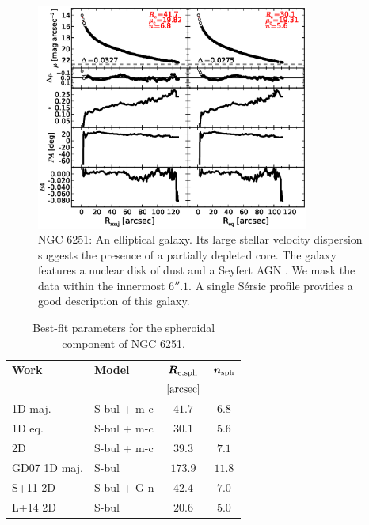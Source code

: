 \documentclass[preprint2]{emulateapj}
\newcommand{\fitfigurewidth}{0.8\textwidth}
\begin{document}
  \begin{figure}[h]
  \begin{center}
  \includegraphics[width=\fitfigurewidth]{images/n6251_1Dfit.eps}
  \caption{NGC 6251: 
  An elliptical galaxy. 
  Its large stellar velocity dispersion suggests the presence of a partially depleted core.
  The galaxy features a nuclear disk of dust \citep{ferrareseford1999n6251} and a Seyfert AGN \citep{panessabassani2002}.
  We mask the data within the innermost $6''.1$. 
  A single S\'ersic profile provides a good description of this galaxy.
  }
  \end{center}
  \end{figure}

  \begin{table}[h]
  \small
  \caption{Best-fit parameters for the spheroidal component of NGC 6251.}
  \begin{center}
  \begin{tabular}{llcc}
  \hline
  {\bf Work} & {\bf Model}   & $\bm R_{\rm e,sph}$    & $\bm n_{\rm sph}$ \\
    &  &  $[\rm arcsec]$ & \\
  \hline
  1D maj. & S-bul + m-c & $41.7$  &  $6.8$ \\
  1D eq.  & S-bul + m-c & $30.1$  &  $5.6$ \\
  2D      & S-bul + m-c & $39.3$  &  $7.1$ \\
  \hline
  GD07 1D maj.      & S-bul	     & $173.9$  &  $11.8$ \\
  S+11 2D      & S-bul + G-n    & $42.4$	&  $7.0$ \\
  L+14 2D      & S-bul	     & $20.6$	&  $5.0$ \\
  \hline
  \end{tabular}
  \end{center}
  \label{tab:n6251}
  \end{table}
\end{document}
